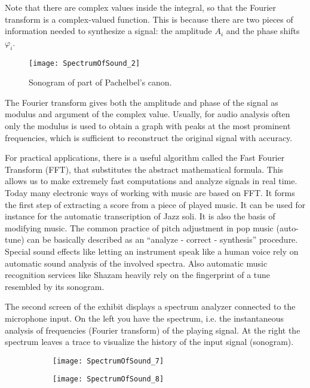 Note that there are complex values inside the integral, so that the Fourier transform is a complex-valued function. This is because there are two pieces of information needed to synthesize a signal: the amplitude $A_i$ and the phase shifts $\varphi_i$.

\begin{wrapfigure}[15]{r}{0.45\textwidth}
\centering
\texttt{[image: SpectrumOfSound\_2]}
\caption*{Sonogram of part of Pachelbel's canon.}
\end{wrapfigure}

The Fourier transform gives both the amplitude and phase of the signal as modulus and argument of the complex value. Usually, for audio analysis often only the modulus is used to obtain a graph with peaks at the most prominent frequencies, which is sufficient to reconstruct the original signal with accuracy.

For practical applications, there is a useful algorithm called the Fast Fourier Transform (FFT), that substitutes the abstract mathematical formula. This allows us to make extremely fast computations and analyze signals in real time. Today many electronic ways of working with music are based on FFT. It forms the first step of extracting a score from a piece of played music. It can be used for instance for the automatic transcription of Jazz soli. It is also the basis of modifying music. The common practice of pitch adjustment in pop music (auto-tune) can be basically described as an ``analyze - correct - synthesis'' procedure. Special sound effects like letting an instrument speak like a human voice rely on automatic sound analysis of the involved spectra. Also automatic music recognition services like Shazam heavily rely on the fingerprint of a tune resembled by its sonogram.

The second screen of the exhibit displays a spectrum analyzer connected to the microphone input. On the left you have the spectrum, i.e. the instantaneous analysis of frequencies (Fourier transform) of the playing signal. At the right the spectrum leaves a trace to visualize the history of the input signal (sonogram).

\begin{figure}[h]
\centering
\begin{subfigure}{0.45\textwidth}
\centering
\texttt{[image: SpectrumOfSound\_7]}
\end{subfigure}
\begin{subfigure}{0.45\textwidth}
\centering
\texttt{[image: SpectrumOfSound\_8]}
\end{subfigure}
\end{figure}

